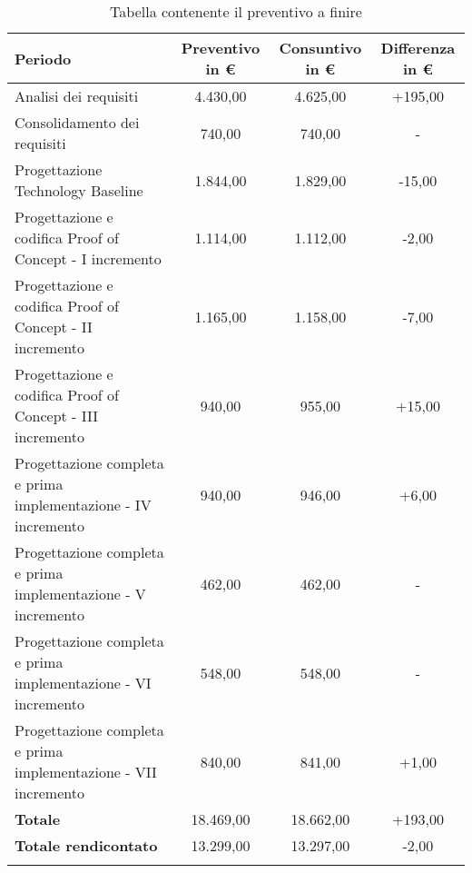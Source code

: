 \begin{longtable}{|p{6cm}|c|c|c|}
	\hline
	\rowcolor{lighter-grayer}
	\textbf{Periodo}             & \textbf{Preventivo in €} & \textbf{Consuntivo in €} & \textbf{Differenza in €} \\
	\hline
	\endfirsthead

	\hline
	Analisi dei requisiti            & 4.430,00        & 4.625,00  & +195,00   \\ 
	\hline
	\hline
	Consolidamento dei requisiti     & 740,00        & 740,00    & -  \\ 
	\hline
	\hline
	Progettazione Technology Baseline      & 1.844,00       & 1.829,00  & -15,00  \\
	\hline
	\hline
	Progettazione e codifica Proof of Concept - I incremento      & 1.114,00            & 1.112,00   & -2,00          \\
	\hline
	\hline
	Progettazione e codifica Proof of Concept - II incremento     & 1.165,00            & 1.158,00 & -7,00           \\
	\hline
	\hline
	Progettazione e codifica Proof of Concept - III incremento    & 940,00       & 955,00  & +15,00   \\
	\hline
	\hline
	Progettazione completa e prima implementazione - IV incremento    & 940,00       & 946,00  & +6,00   \\
	\hline
	\hline
	Progettazione completa e prima implementazione - V incremento    & 462,00       & 462,00  & -   \\
	\hline
	\hline
	Progettazione completa e prima implementazione - VI incremento    & 548,00       & 548,00  & -   \\
	\hline
	\hline
	Progettazione completa e prima implementazione - VII incremento    & 840,00       & 841,00  & +1,00   \\
	\hline
	\textbf{Totale } & 18.469,00     & 18.662,00   &  +193,00       \\
	\hline
	\hline
	\textbf{Totale rendicontato} & 13.299,00       & 13.297,00     & -2,00     \\
	\hline
	\hline
	\rowcolor{white}
	\caption{Tabella contenente il preventivo a finire}
\end{longtable}

